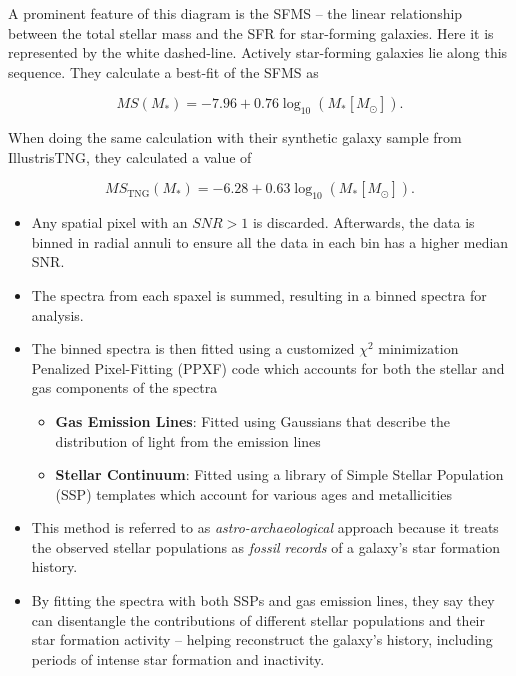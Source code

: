 \documentclass[svgnames]{article}     %
\begin{document}
A prominent feature of this diagram is the SFMS -- the linear relationship
between the total stellar mass and the SFR for star-forming galaxies. Here it
is represented by the white dashed-line. Actively star-forming galaxies lie
along this sequence. They calculate a best-fit of the SFMS as 

\[
  MS(M_*) = -7.96 + 0.76\log_{10}(M_*[M_\odot]).
\] \vspace{3px}

When doing the same calculation with their synthetic galaxy sample from
IllustrisTNG, they calculated a value of 

\[
  MS_\text{TNG}(M_*) = -6.28 + 0.63 \log_{10} (M_* [M_\odot]). 
\] \vspace{3px}

\begin{itemize}
  \item Any spatial pixel with an $SNR>1$ is discarded. Afterwards, the data is
    binned in radial annuli to ensure all the data in each bin has a higher
    median SNR. 
  \item The spectra from each spaxel is summed, resulting in a binned spectra
    for analysis. 
  \item The binned spectra is then fitted using a customized $\chi^2$ 
    minimization Penalized Pixel-Fitting (PPXF) code which accounts for both
    the stellar and gas components of the spectra 
    \begin{itemize}
      \item \textbf{Gas Emission Lines}: Fitted using Gaussians that describe
        the distribution of light from the emission lines 
      \item \textbf{Stellar Continuum}: Fitted using a library of Simple
        Stellar Population (SSP) templates which account for various ages and
        metallicities
    \end{itemize}
  \item This method is referred to as  \textit{astro-archaeological} approach
    because it treats the observed stellar populations as \textit{fossil
    records} of a galaxy's star formation history. 
  \item By fitting the spectra with both SSPs and gas emission lines, they say
    they can disentangle the contributions of different stellar populations and
    their star formation activity -- helping reconstruct the galaxy's history,
    including periods of intense star formation and inactivity. 
\end{itemize}
\end{document}
